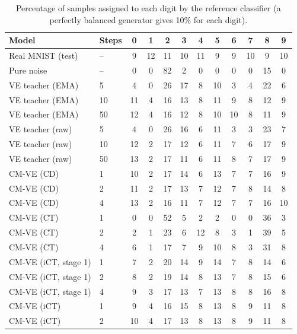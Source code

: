 \documentclass{article}
\begin{document}
\begin{table}[!htbp]
  \caption{Percentage of samples assigned to each digit by the reference
  classifier (a perfectly balanced generator gives 10\% for each digit).}
  \label{tab:digits}
  \centering
  \footnotesize
  \setlength{\tabcolsep}{4pt}
  \begin{tabular}{llcccccccccc}
    \toprule
    Model & Steps & 0 & 1 & 2 & 3 & 4 & 5 & 6 & 7 & 8 & 9 \\
    \midrule
    Real MNIST (test) & -- & 9 & 12 & 11 & 10 & 11 & 9 & 9 & 10 & 9 & 10 \\
    Pure noise & -- & 0 & 0 & 82 & 2 & 0 & 0 & 0 & 0 & 15 & 0 \\
    \midrule
    VE teacher (EMA) & 5 & 4 & 0 & 26 & 17 & 8 & 10 & 3 & 4 & 22 & 6 \\
    VE teacher (EMA) & 10 & 11 & 4 & 16 & 13 & 8 & 11 & 9 & 8 & 12 & 9 \\
    VE teacher (EMA) & 50 & 12 & 4 & 16 & 12 & 8 & 10 & 10 & 8 & 11 & 9 \\
    VE teacher (raw) & 5 & 4 & 0 & 26 & 16 & 6 & 11 & 3 & 3 & 23 & 7 \\
    VE teacher (raw) & 10 & 12 & 2 & 17 & 12 & 6 & 11 & 7 & 6 & 17 & 9 \\
    VE teacher (raw) & 50 & 13 & 2 & 17 & 11 & 6 & 11 & 8 & 7 & 17 & 9 \\
    \midrule
    CM-VE (CD) & 1 & 10 & 2 & 17 & 14 & 6 & 13 & 7 & 7 & 16 & 9 \\
    CM-VE (CD) & 2 & 11 & 2 & 17 & 13 & 7 & 12 & 7 & 8 & 14 & 8 \\
    CM-VE (CD) & 4 & 13 & 2 & 16 & 11 & 7 & 12 & 7 & 7 & 16 & 10 \\
    \midrule
    CM-VE (CT) & 1 & 0 & 0 & 52 & 5 & 2 & 2 & 0 & 0 & 36 & 3 \\
    CM-VE (CT) & 2 & 2 & 1 & 23 & 6 & 12 & 8 & 3 & 1 & 39 & 5 \\
    CM-VE (CT) & 4 & 6 & 1 & 17 & 7 & 9 & 10 & 8 & 3 & 31 & 8 \\
    \midrule
    CM-VE (iCT, stage 1) & 1 & 7 & 2 & 20 & 14 & 9 & 14 & 7 & 8 & 14 & 6 \\
    CM-VE (iCT, stage 1) & 2 & 8 & 2 & 19 & 14 & 8 & 13 & 7 & 8 & 15 & 6 \\
    CM-VE (iCT, stage 1) & 4 & 9 & 3 & 17 & 13 & 7 & 13 & 8 & 8 & 16 & 8 \\
    \midrule
    CM-VE (iCT) & 1 & 9 & 4 & 16 & 15 & 8 & 13 & 8 & 9 & 11 & 8 \\
    CM-VE (iCT) & 2 & 10 & 4 & 17 & 13 & 8 & 13 & 8 & 9 & 11 & 8 \\

\end{tabular}
\end{table}
\end{document}
